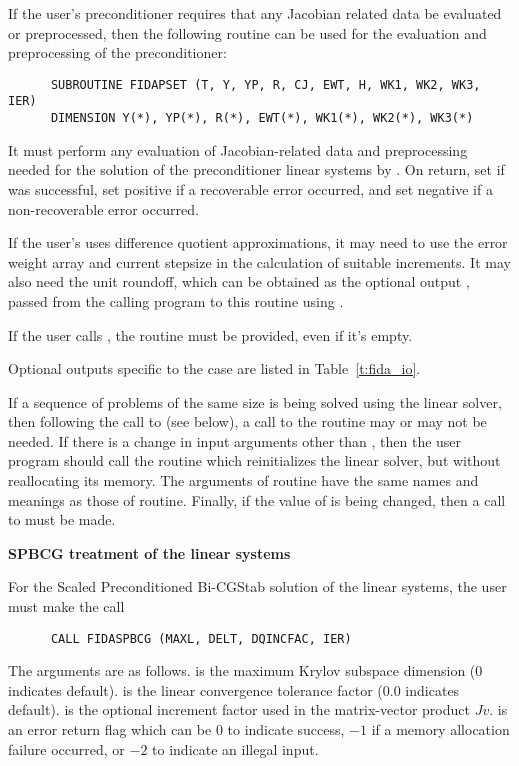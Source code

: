 \begin{Steps}
  If the user's preconditioner requires that any Jacobian related data be evaluated
  or preprocessed, then the following routine can be used for the evaluation and 
  preprocessing of the preconditioner:
\begin{verbatim}
      SUBROUTINE FIDAPSET (T, Y, YP, R, CJ, EWT, H, WK1, WK2, WK3, IER)
      DIMENSION Y(*), YP(*), R(*), EWT(*), WK1(*), WK2(*), WK3(*) 
\end{verbatim}
  It must perform any evaluation of Jacobian-related data and preprocessing needed
  for the solution of the preconditioner linear systems by .
  On return, set  if  was successful, set 
  positive if a recoverable error occurred, and set  negative if a 
  non-recoverable error occurred.
  
  If the user's  uses difference quotient approximations, it
  may need to use the error weight array  and current stepsize 
  in the calculation of suitable increments.  It may also need the unit
  roundoff, which can be obtained as the optional output ,
  passed from the calling program to this routine using .

  {\warn} If the user calls , the routine  must
  be provided, even if it's empty.

  Optional outputs specific to the {\spgmr} case are listed in Table~\ref{t:fida_io}.
  
  If a sequence of problems of the same size is being solved using the {\spgmr}
  linear solver, then following the call to  (see below), a call to
  the  routine may or may not be needed.  If there is a change in input
  arguments other than , then the user program should call the routine
   which reinitializes the {\spgmr} linear solver, but without
  reallocating its memory. The arguments of  routine have the same
  names and meanings as those of  routine.  Finally, if the value of
   is being changed, then a call to  must be made.

  {\s}{\p} {\bf SPBCG treatment of the linear systems}
  
  For the Scaled Preconditioned Bi-CGStab solution of the linear systems,
  the user must make the call
\begin{verbatim}
      CALL FIDASPBCG (MAXL, DELT, DQINCFAC, IER)
\end{verbatim}
  The arguments are as follows.
   is the maximum Krylov subspace dimension ($0$ indicates default).
   is the linear convergence tolerance factor ($0.0$ indicates default).
   is the optional increment factor used in the matrix-vector product $Jv$.
   is an error return flag which can be $0$ to indicate success, $-1$
  if a memory allocation failure occurred, or $-2$ to indicate an illegal input.
  

\end{Steps}
